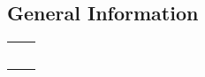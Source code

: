 \subsection{General Information}
\begin{table}[h]
    \begin{tabular}{L{4cm}L{12cm}}
         \hline
             & \gcell{\experiment}                \\
                & \gcell{\subject}                   \\
            & \gcell{\gender\ , \age}              \\
                   & \gcell{\today\ , \currenttime}      \\
                & \gcell{\comment}                   \\
         \hline
    \end{tabular}
\end{table}